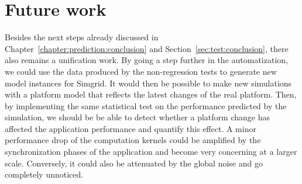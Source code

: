     \section{Future work}%

        Besides the next steps already discussed in Chapter~\ref{chapter:prediction:conclusion} and
        Section~\ref{sec:test:conclusion}, there also remains a unification work. By going a step further in the
        automatization, we could use the data produced by the non-regression tests to generate new model instances for
        Simgrid. It would then be possible to make new simulations with a platform model that reflects the latest
        changes of the real platform. Then, by implementing the same statistical test on the performance predicted by
        the simulation, we should be be able to detect whether a platform change has affected the application
        performance and quantify this effect. A minor performance drop of the computation kernels could be amplified by
        the synchronization phases of the application and become very concerning at a larger scale. Conversely, it could
        also be attenuated by the global noise and go completely unnoticed.
